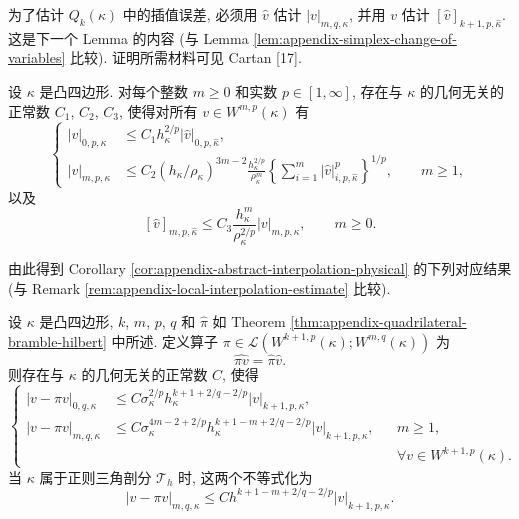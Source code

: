 为了估计 $Q_k(\kappa)$ 中的插值误差, 必须用 $\hat v$ 估计
$|v|_{m,q,\kappa}$, 并用 $v$ 估计
$[\hat v]_{k+1,p,\hat\kappa}$. 这是下一个 Lemma 的内容
(与 Lemma \ref{lem:appendix-simplex-change-of-variables} 比较).
证明所需材料可见 Cartan [17].

\setcounter{statement}{8}
\begin{Lemma}\label{lem:appendix-quadrilateral-change-of-variables}
设 $\kappa$ 是凸四边形. 对每个整数 $m\geq0$ 和实数
$p\in[1,\infty]$, 存在与 $\kappa$ 的几何无关的正常数
$C_1$, $C_2$, $C_3$, 使得对所有 $v\in W^{m,p}(\kappa)$ 有
\begin{equation}\label{eq:appendix-quadrilateral-change-physical}
\left\{
\begin{aligned}
|v|_{0,p,\kappa}
&\leq
C_1h_\kappa^{2/p}|\hat v|_{0,p,\hat\kappa},\\
|v|_{m,p,\kappa}
&\leq
C_2(h_\kappa/\rho_\kappa)^{3m-2}
\frac{h_\kappa^{2/p}}{\rho_\kappa^m}
\left\{\sum_{i=1}^m|\hat v|_{i,p,\hat\kappa}^p\right\}^{1/p},
\qquad m\geq1,
\end{aligned}
\right.
\end{equation}
以及
\begin{equation}\label{eq:appendix-quadrilateral-change-reference}
[\hat v]_{m,p,\hat\kappa}
\leq
C_3\frac{h_\kappa^m}{\rho_\kappa^{2/p}}
|v|_{m,p,\kappa},
\qquad
m\geq0.
\end{equation}
\end{Lemma}

由此得到 Corollary
\ref{cor:appendix-abstract-interpolation-physical} 的下列对应结果
(与 Remark \ref{rem:appendix-local-interpolation-estimate} 比较).

\setcounter{statement}{4}
\begin{Corollary}\label{cor:appendix-quadrilateral-interpolation-error}
设 $\kappa$ 是凸四边形, $k$, $m$, $p$, $q$ 和 $\hat\pi$ 如
Theorem \ref{thm:appendix-quadrilateral-bramble-hilbert} 中所述.
定义算子
$\pi\in\mathcal{L}(W^{k+1,p}(\kappa);W^{m,q}(\kappa))$ 为
\[
\widehat{\pi v}=\hat\pi\hat v.
\]
则存在与 $\kappa$ 的几何无关的正常数 $C$, 使得
\begin{equation}\label{eq:appendix-quadrilateral-interpolation-error}
\left\{
\begin{aligned}
|v-\pi v|_{0,q,\kappa}
&\leq
C\sigma_\kappa^{2/p}
h_\kappa^{k+1+2/q-2/p}
|v|_{k+1,p,\kappa},\\
|v-\pi v|_{m,q,\kappa}
&\leq
C\sigma_\kappa^{4m-2+2/p}
h_\kappa^{k+1-m+2/q-2/p}
|v|_{k+1,p,\kappa},
&&m\geq1,\\
&&&\forall v\in W^{k+1,p}(\kappa).
\end{aligned}
\right.
\end{equation}
当 $\kappa$ 属于正则三角剖分 $\mathcal{T}_h$ 时, 这两个不等式化为
\begin{equation}\label{eq:appendix-quadrilateral-interpolation-error-regular}
|v-\pi v|_{m,q,\kappa}
\leq
Ch^{k+1-m+2/q-2/p}|v|_{k+1,p,\kappa}.
\end{equation}
\end{Corollary}

